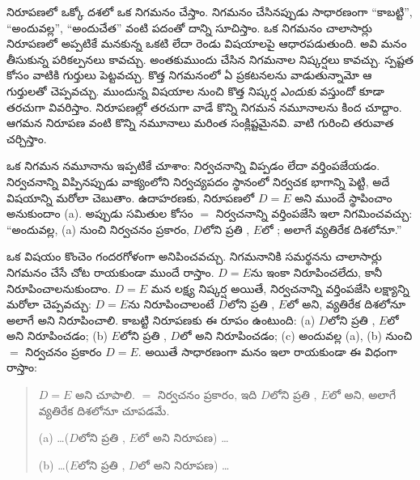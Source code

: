 \documentclass[../../../include/open-logic-section]{subfiles}
\begin{document}


నిరూపణలో ఒక్కో దశలో ఒక నిగమనం చేస్తాం. నిగమనం చేసినప్పుడు
సాధారణంగా ``కాబట్టి'', ``అందువల్ల'', ``అందుచేత'' వంటి పదంతో
దాన్ని సూచిస్తాం. ఒక నిగమనం చాలాసార్లు నిరూపణలో అప్పటికే
మనకున్న ఒకటి లేదా రెండు విషయాలపై ఆధారపడుతుంది. అవి మనం
తీసుకున్న పరికల్పనలు కావచ్చు. అంతకుముందు చేసిన నిగమనాల
నిష్కర్షలు కావచ్చు. స్పష్టత కోసం వాటికి గుర్తులు పెట్టవచ్చు. కొత్త
నిగమనంలో ఏ ప్రకటనలను వాడుతున్నామో ఆ గుర్తులతో చెప్పవచ్చు. ముందున్న
విషయాల నుంచి కొత్త నిష్కర్ష \emph{ఎందుకు} వస్తుందో కూడా
తరచుగా వివరిస్తాం. నిరూపణల్లో తరచుగా వాడే కొన్ని నిగమన
నమూనాలను కింద చూద్దాం. ఆగమన నిరూపణ వంటి కొన్ని నమూనాలు
మరింత సంక్లిష్టమైనవి. వాటి గురించి తరువాత చర్చిస్తాం.

ఒక నిగమన నమూనాను ఇప్పటికే చూశాం: నిర్వచనాన్ని విప్పడం లేదా వర్తింపజేయడం. నిర్వచనాన్ని విప్పినప్పుడు వాక్యంలోని నిర్వచ్యపదం స్థానంలో నిర్వచక భాగాన్ని పెట్టి, అదే విషయాన్ని మరోలా చెబుతాం. ఉదాహరణకు, నిరూపణలో $D = E$ అని ముందే స్థాపించాం అనుకుందాం (a). అప్పుడు సమితుల కోసం $=$ నిర్వచనాన్ని వర్తింపజేసి ఇలా నిగమించవచ్చు: ``అందువల్ల, (a) నుంచి నిర్వచనం ప్రకారం, $D$లోని ప్రతి , $E$లో ; అలాగే వ్యతిరేక దిశలోనూ.''

ఒక విషయం కొంచెం గందరగోళంగా అనిపించవచ్చు. నిగమనానికి సమర్థనను చాలాసార్లు నిగమనం చేసే చోట రాయకుండా ముందే రాస్తాం. $D = E$ను ఇంకా నిరూపించలేదు, కానీ నిరూపించాలనుకుందాం. $D = E$ మన లక్ష్య నిష్కర్ష అయితే, నిర్వచనాన్ని వర్తింపజేసి లక్ష్యాన్ని మరోలా చెప్పవచ్చు: $D = E$ను నిరూపించాలంటే $D$లోని ప్రతి , $E$లో  అని, వ్యతిరేక దిశలోనూ అలాగే అని నిరూపించాలి. కాబట్టి నిరూపణకు ఈ రూపం ఉంటుంది: (a) $D$లోని ప్రతి , $E$లో  అని నిరూపించడం; (b) $E$లోని ప్రతి , $D$లో  అని నిరూపించడం; (c) అందువల్ల (a), (b) నుంచి $=$ నిర్వచనం ప్రకారం $D = E$. అయితే సాధారణంగా మనం ఇలా రాయకుండా ఈ విధంగా రాస్తాం:
\begin{quote}
$D = E$ అని చూపాలి. $=$ నిర్వచనం ప్రకారం, ఇది $D$లోని ప్రతి , $E$లో  అని, అలాగే వ్యతిరేక దిశలోనూ చూపడమే.

(a) \dots ($D$లోని ప్రతి , $E$లో  అని నిరూపణ) \dots

(b) \dots ($E$లోని ప్రతి , $D$లో  అని నిరూపణ) \dots
\end{quote}
\end{document}
